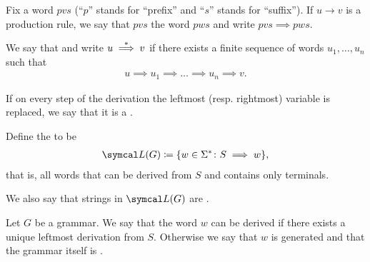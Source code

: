 \begin{definition}\label{def:grammar_derivation}\cite[104,108]{Sipser2013}
  Fix a word \( pvs \) (\enquote{\( p \)} stands for \enquote{prefix} and \enquote{\( s \)} stands for \enquote{suffix}). If \( u \to v \) is a production rule, we say that \( pvs \)  the word \( pws \) and write \( pvs \implies pws \).

  We say that  and write \( u \overset * \implies v \) if there exists a finite sequence of words \( u_1, \ldots, u_n \) such that
  \begin{align*}
    u \implies u_1 \implies \ldots \implies u_n \implies v.
  \end{align*}

  If on every step of the derivation the leftmost (resp. rightmost) variable is replaced, we say that it is a .

  Define the  to be
  \begin{align*}
    \Cal{L}(G) \coloneqq \{ w \in \Sigma^* \colon S \implies w \},
  \end{align*}
  that is, all words that can be derived from \( S \) and contains only terminals.

  We also say that strings in \( \Cal{L}(G) \) are .
\end{definition}

\begin{definition}\label{def:ambiguous_grammar}\cite[definition 2.7]{Sipser2013}
  Let \( G \) be a grammar. We say that the word \( w \) can be derived  if there exists a unique leftmost derivation from \( S \). Otherwise we say that \( w \) is generated  and that the grammar itself is .
\end{definition}

